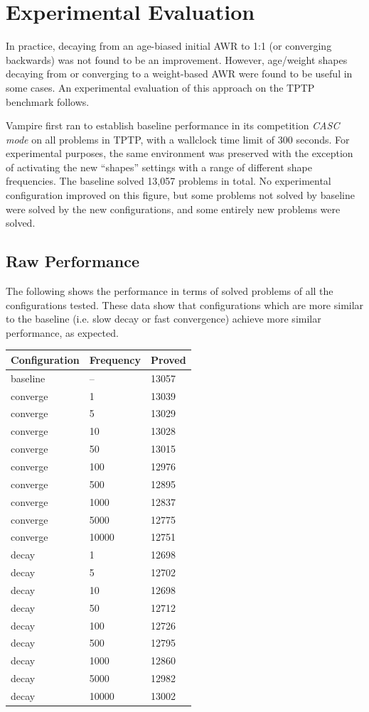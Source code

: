 \documentclass{llncs}
\begin{document}
\section{Experimental Evaluation}
In practice, decaying from an age-biased initial AWR to 1:1 (or converging backwards) was not found to be an improvement.
However, age/weight shapes decaying from or converging to a weight-based AWR were found to be useful in some cases.
An experimental evaluation of this approach on the TPTP~\cite{tptp} benchmark follows.

Vampire first ran to establish baseline performance in its competition \emph{CASC mode} on all problems in TPTP, with a wallclock time limit of 300 seconds.
For experimental purposes, the same environment was preserved with the exception of activating the new ``shapes'' settings with a range of different shape frequencies.
The baseline solved 13,057 problems in total.
No experimental configuration improved on this figure, but some problems not solved by baseline were solved by the new configurations, and some entirely new problems were solved.

\subsection{Raw Performance}
The following shows the performance in terms of solved problems of all the configurations tested.
These data show that configurations which are more similar to the baseline (i.e. slow decay or fast convergence) achieve more similar performance, as expected.

\begin{center}
\begin{tabular}{l l l}
	Configuration & Frequency & Proved\\
	\hline
	baseline & -- & 13057\\
	\hline
	converge & 1 & 13039\\
	converge & 5 & 13029\\
	converge & 10 & 13028\\
	converge & 50 & 13015\\
	converge & 100 & 12976\\
	converge & 500 & 12895\\
	converge & 1000 & 12837\\
	converge & 5000 & 12775\\
	converge & 10000 & 12751\\
	\hline
	decay & 1 & 12698\\
	decay & 5 & 12702\\
	decay & 10 & 12698\\
	decay & 50 & 12712\\
	decay & 100 & 12726\\
	decay & 500 & 12795\\
	decay & 1000 & 12860\\
	decay & 5000 & 12982\\
	decay & 10000 & 13002\\
\end{tabular}
\end{center}
\end{document}
